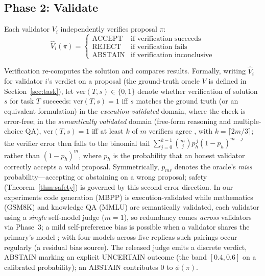 \documentclass{article}
\begin{document}
\subsection{Phase 2: Validate}
\label{sec:validate}

Each validator $V_i$ independently verifies proposal $\pi$:
\begin{equation}
    \hat{V}_i(\pi) = \begin{cases}
        \text{ACCEPT} & \text{if verification succeeds} \\
        \text{REJECT} & \text{if verification fails} \\
        \text{ABSTAIN} & \text{if verification inconclusive}
    \end{cases}
\end{equation}

Verification re-computes the solution and compares results. Formally, writing $\hat{V}_i$ for validator $i$'s verdict on a proposal (the ground-truth oracle $V$ is defined in Section~\ref{sec:task}), let $\mathrm{ver}(T, s) \in \{0,1\}$ denote whether verification of solution $s$ for task $T$ succeeds: $\mathrm{ver}(T, s) = 1$ iff $s$ matches the ground truth (or an equivalent formulation) in the \emph{execution-validated} domain, where the check is error-free; in the \emph{semantically validated} domain (free-form reasoning and multiple-choice QA), $\mathrm{ver}(T, s) = 1$ iff at least $k$ of $m$ verifiers agree \citep{zheng2023llm}, with $k = \lceil 2m/3 \rceil$; the verifier error then falls to the binomial tail $\sum_{j=0}^{k-1}\binom{m}{j}p_h^{\,j}(1-p_h)^{m-j}$ rather than $(1-p_h)^m$, where $p_h$ is the probability that an honest validator correctly accepts a valid proposal. Symmetrically, $p_{\mathit{mr}}$ denotes the oracle's \emph{miss} probability---accepting or abstaining on a wrong proposal; safety (Theorem~\ref{thm:safety}) is governed by this second error direction. In our experiments code generation (MBPP) is execution-validated while mathematics (GSM8K) and knowledge QA (MMLU) are semantically validated, each validator using a \emph{single} self-model judge ($m{=}1$), so redundancy comes \emph{across} validators via Phase~3; a mild self-preference bias is possible when a validator shares the primary's model \citep{zheng2023llm}; with four models across five replicas such pairings occur regularly (a residual bias source). The released judge emits a discrete verdict, ABSTAIN marking an explicit UNCERTAIN outcome (the band $[0.4, 0.6]$ on a calibrated probability); an ABSTAIN contributes 0 to $\phi(\pi)$.
\end{document}

